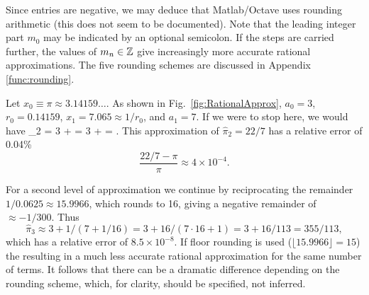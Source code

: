 \documentclass{ximera}
\begin{document}
 {\red
Since entries are negative, we may deduce that Matlab/Octave uses rounding arithmetic
(this does not seem to be documented).
 }
Note that the leading integer part $m_0$ may be indicated by an optional semicolon.%
If the steps are carried further, the values of $m_n \in \mathbb{Z}$ give increasingly more accurate
rational approximations.  The five rounding schemes are discussed in Appendix \ref{func:rounding}.

\BEx %
Let $x_0 \equiv \pi \approx 3.14159\ldots.$
As shown in Fig.~\ref{fig:RationalApprox},
 $a_0=3$,
 $r_0 = 0.14159$,
 $x_1 = 7.065 \approx 1/r_0$,
and
 $a_1 = 7$.
If we were to stop here, we would have
\be
\widehat{\pi}_2 = 3 +  = 3 +  = .
\ee
This approximation of $\widehat{\pi}_2 = 22/7$ has a relative error of 0.04\%
 \label{eq:PiRelError}
\[
\frac{22/7 -\pi}{\pi} \approx 4\times10^{-4}.
\]
\EEx

\BEx %
For a second level of approximation we continue by reciprocating the remainder $1/0.0625 \approx 15.9966$,
which rounds to 16, giving a negative remainder of $\approx -1/300$. 
Thus
\[
\widehat{\pi}_3 \approx 3 + 1/(7 + 1/16) = 3+16/(7\cdot 16+1)= 3+ 16/113 = 355/113,
\]
which has a relative error of $8.5\times10^{-8}$.
If floor rounding is used ($\lfloor 15.9966\rfloor=15$) 
the resulting in a much less accurate rational approximation for the same number of terms.
It follows that there can be a dramatic difference depending on the rounding scheme, which, for clarity,
should be specified, not inferred.
\EEx
\end{document}
